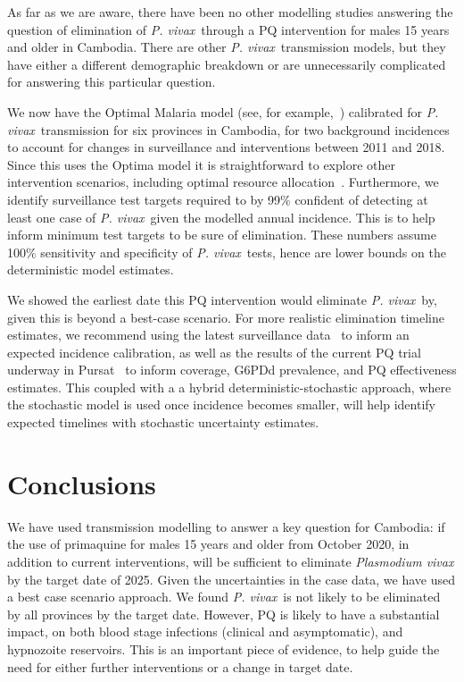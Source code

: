 \documentclass[doublespacing]{bmcart}
\newcommand{\pv}{\textit{P. vivax}}
\begin{document}
As far as we are aware, there have been no other modelling studies answering the question of elimination of \pv~through a PQ intervention for males 15 years and older in Cambodia. There are other \pv~transmission models, but they have either a different demographic breakdown or are unnecessarily complicated for answering this particular question.

We now have the Optimal Malaria model (see, for example,~\cite{scott}) calibrated for \pv~transmission for six provinces in Cambodia, for two background incidences to account for changes in surveillance and interventions between 2011 and 2018. Since this uses the Optima model it is straightforward to explore other intervention scenarios, including optimal resource allocation~\cite{optima}.
% 
Furthermore, we identify surveillance test targets required to by 99\% confident of detecting at least one case of \pv~given the modelled annual incidence. This is to help inform minimum test targets to be sure of elimination. These numbers assume 100\% sensitivity and specificity of \pv~tests, hence are lower bounds on the deterministic model estimates.

 We showed the earliest date this PQ intervention would eliminate \pv~by, given this is beyond a best-case scenario. For more realistic elimination timeline estimates, we recommend using the latest surveillance data~\cite{pengby_mobile} to inform an expected incidence calibration, as well as the results of the current PQ trial underway in Pursat~\cite{CNM_trial} to inform coverage, G6PDd prevalence, and PQ effectiveness estimates. This coupled with a a hybrid deterministic-stochastic approach, where the stochastic model is used once incidence becomes smaller, will help identify expected timelines with stochastic uncertainty estimates. 

\section*{Conclusions}

We have used transmission modelling to answer a key question for Cambodia: if the use of primaquine for males 15 years and older from October 2020, in addition to current interventions, will be sufficient to eliminate \textit{Plasmodium vivax} by the target date of 2025. Given the uncertainties in the case data, we have used a best case scenario approach. We found \pv~is not likely to be eliminated by all provinces by the target date. However, PQ is likely to have a substantial impact, on both blood stage infections (clinical and asymptomatic), and hypnozoite reservoirs. This is an important piece of evidence, to help guide the need for either further interventions or a change in target date. 
\end{document}
